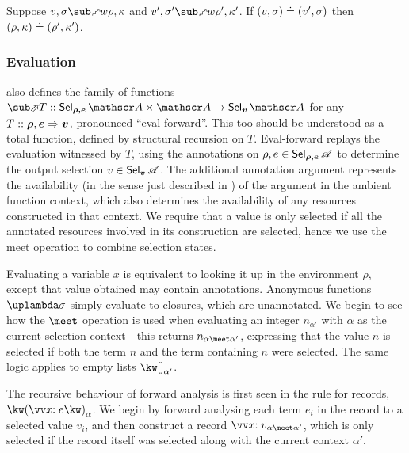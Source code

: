 \begin{lemma}
   Suppose $v, \sigma \matchFwdR{w} \rho, \kappa$ and $v', \sigma' \matchFwdR{w} \rho', \kappa'$. If $(v, \sigma) \doteq (v', \sigma)$ then $(\rho, \kappa) \doteq (\rho', \kappa')$.
\end{lemma}

\subsubsection{Evaluation}

 also defines the family of functions $\evalFwdF{T} :: \Prod{\Sel{\rho, e}{A}}{\Ann{A}} \to \Sel{v}{A}$ for any $T :: \bm{\rho}, \bm{e} \Rightarrow \bm{v}$, pronounced ``eval-forward''. This too should be understood as a total function, defined by structural recursion on $T$. Eval-forward replays the evaluation witnessed by $T$, using the annotations on $\rho, e \in \textup{\textsf{Sel}}_{\bm{\rho,e}}\,{\mathscr{A}}$ to determine the output selection $v \in \textup{\textsf{Sel}}_{\bm{v}}\,{\mathscr{A}}$. The additional annotation argument represents the availability (in the sense just described in ) of the argument in the ambient function context, which also determines the availability of any resources constructed in that context. We require that a value is only selected if all the annotated resources involved in its construction are selected, hence we use the meet operation to combine selection states.

Evaluating a variable $x$ is equivalent to looking it up in the environment $\rho$, except that value obtained may contain annotations. Anonymous functions $\exLambda{\sigma}$ simply evaluate to closures, which are unannotated. We begin to see how the $\meet$ operation is used when evaluating an integer $n_{\alpha'}$ with $\alpha$ as the current selection context - this returns $\annot{n}{\alpha \meet \alpha'}$, expressing that the value $n$ is selected if both the term $n$ and the term containing $n$ were selected. The same logic applies to empty lists $\annot{\exNil}{\alpha'}$.

The recursive behaviour of forward analysis is first seen in the rule for records, $\exRec{\vec{\bind{x}{e}}}_{\alpha}$. We begin by forward analysing each term $e_i$ in the record to a selected value $v_i$, and then construct a record $\annot{\vec{\bind{x}{v}}}{\alpha \meet \alpha'}$, which is only selected if the record itself was selected along with the current context $\alpha'$.

